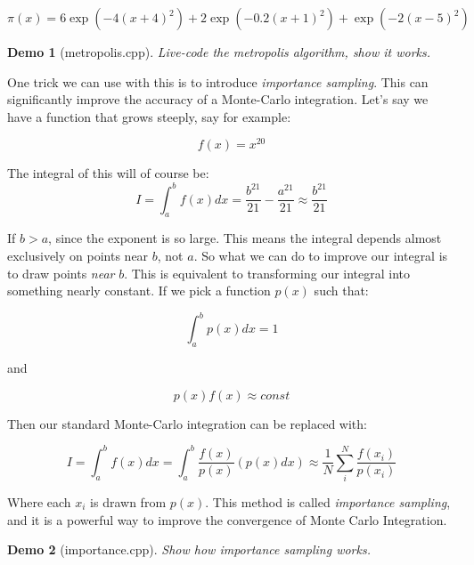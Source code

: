 \documentclass{article}
\theoremstyle{demo}
\newtheorem{demo}{Demo}[section]
\begin{document}
\begin{equation}
    \pi(x) = 6\exp\left(-4(x+4)^2\right) + 2\exp\left(-0.2(x+1)^2\right) + \exp\left(-2(x-5)^2\right)
\end{equation}

\begin{demo}[metropolis.cpp]
    Live-code the metropolis algorithm, show it works.
\end{demo}

One trick we can use with this is to introduce \textit{importance sampling}.
This can significantly improve the accuracy of a Monte-Carlo integration.
Let's say we have a function that grows steeply, say for example:

\begin{equation}
    f(x) = x^{20}
\end{equation}

The integral of this will of course be:
\begin{equation}
    I = \int_a^b f(x) dx = \frac{b^{21}}{21} - \frac{a^{21}}{21} \approx
    \frac{b^{21}}{21}
\end{equation}

If $b>a$, since the exponent is so large.  This means the integral depends
almost exclusively on points near $b$, not $a$.  So what we can do to improve
our integral is to draw points \textit{near} $b$.  This is equivalent to
transforming our integral into something nearly constant.  If we pick a function
$p(x)$ such that:

\begin{equation}
    \int_a^b p(x)dx  = 1
\end{equation}

and

\begin{equation}
    p(x)f(x) \approx const
\end{equation}

Then our standard Monte-Carlo integration can be replaced with:

\begin{equation}
    I = \int_a^b f(x) dx = \int_a^b \frac{f(x)}{p(x)} (p(x) dx) \approx
    \frac{1}{N} \sum_i^{N} \frac{f(x_i)}{p(x_i)}
\end{equation}

Where each $x_i$ is drawn from $p(x)$.  This method is called \textit{importance
sampling}, and it is a powerful way to improve the convergence of Monte Carlo
Integration.

\begin{demo}[importance.cpp]
    Show how importance sampling works.
\end{demo}
\end{document}
